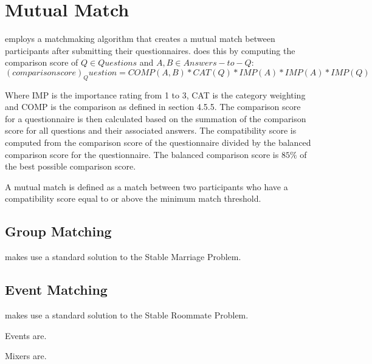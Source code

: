 \section{Mutual Match}
\label{sec:matching}
\Friending{} employs a matchmaking algorithm that creates a mutual match between participants after submitting their questionnaires.  \Friending{} does this by computing the comparison score of $Q \in Questions$ and $A,B \in Answers-to-Q$:
\begin{equation}
(comparison score)_Question = COMP(A,B)*CAT(Q)*IMP(A)*IMP(A)*IMP(Q) 
\end{equation}

Where IMP is the importance rating from 1 to 3, CAT is the category weighting and COMP is the comparison as defined in section 4.5.5.   The comparison score for a questionnaire is then calculated based on the summation of the comparison score for all questions and their associated answers.
The compatibility score is computed from the comparison score of the questionnaire divided by the balanced comparison score for the questionnaire.  The balanced comparison score is $85\%$ of the best possible comparison score.

A mutual match is defined as a match between two participants who have a compatibility score equal to or above the minimum match threshold.  

\subsection{Group Matching}
\label{sec:groupmatch}
\Friending{} makes use a standard solution to the Stable Marriage Problem.

\subsection{Event Matching}
\label{sec:eventmatch}
\Friending{} makes use a standard solution to the Stable Roommate Problem.

Events are.

Mixers are.